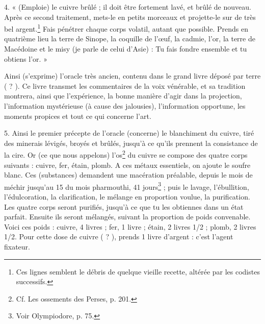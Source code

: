 \documentclass[a4paper, 11pt, oneside, polutonikogreek, french]{article}
\begin{document}
4. « (Emploie) le cuivre brûlé ; il doit être fortement lavé, et brûlé de nouveau. Après ce second traitement, mets-le en petits morceaux et projette-le sur de très bel argent.\footnote{Ces lignes semblent le débris de quelque vieille recette, altérée par les codistes successifs.} Fais pénétrer chaque corps volatil, autant que possible. Prends en quatrième lieu la terre de Sinope, la coquille de l'œuf, la cadmie, l'or, la terre de Macédoine et le misy (je parle de celui d'Asie) : Tu fais fondre ensemble et tu obtiens l'or. »

Ainsi (s'exprime) l'oracle très ancien, contenu dans le grand livre déposé par terre ( ? ). Ce livre transmet les commentaires de la voix vénérable, et sa tradition montrera, ainsi que l'expérience, la bonne manière d'agir dans la projection, l'information mystérieuse (à cause des jalousies), l'information opportune, les moments propices et tout ce qui concerne l'art.

5. Ainsi le premier précepte de l'oracle (concerne) le blanchiment du cuivre, tiré des minerais lévigés, broyés et brûlés, jusqu'à ce qu'ils prennent la consistance de la cire. Or (ce que nous appelons) l'os\footnote{Cf. Les ossements des Perses, p. 201.} du cuivre se compose des quatre corps suivants : cuivre, fer, étain, plomb. A ces métaux essentiels, on ajoute le soufre blanc. Ces (substances) demandent une macération préalable, depuis le mois de méchir jusqu'au 15 du mois pharmouthi, 41 jours\footnote{Voir Olympiodore, p. 75.} ; puis le lavage, l'ébullition, l'édulcoration, la clarification, le mélange en proportion voulue, la purification. Les quatre corps seront purifiés, jusqu'à ce que tu les obtiennes dans un état parfait. Ensuite ils seront mélangés, suivant la proportion de poids convenable. Voici ces poids : cuivre, 4 livres ; fer, 1 livre ; étain, 2 livres 1/2 ; plomb, 2 livres 1/2. Pour cette dose de cuivre ( ? ), prends 1 livre d'argent : c'est l'agent fixateur.
\end{document}
